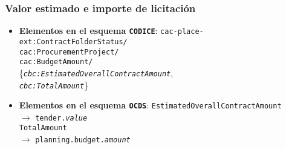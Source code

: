         \subsubsection{Valor estimado e importe de licitación}
            \begin{itemize}
                \item \textbf{Elementos en el esquema \texttt{CODICE}}:
                    \tabto{7.7cm} \texttt{cac-place-ext:ContractFolderStatus/} \\
                    \tabto{7.7cm} \texttt{cac:ProcurementProject/} \\
                    \tabto{7.7cm} \texttt{cac:BudgetAmount/} \\
                    \tabto{7.7cm} \{\texttt{\textit{cbc:EstimatedOverallContractAmount}}, \\
                    \tabto{7.7cm} \texttt{\textit{cbc:TotalAmount}}\}
                \item \textbf{Elementos en el esquema \texttt{OCDS}}:
                    \tabto{7.7cm} \texttt{EstimatedOverallContractAmount} \\ \tabto{8cm} $\rightarrow$ \texttt{tender.\textit{value}} \\
                    \tabto{7.7cm} \texttt{TotalAmount} \\ \tabto{8cm} $\rightarrow$ \texttt{planning.budget.\textit{amount}}
            \end{itemize}
        
